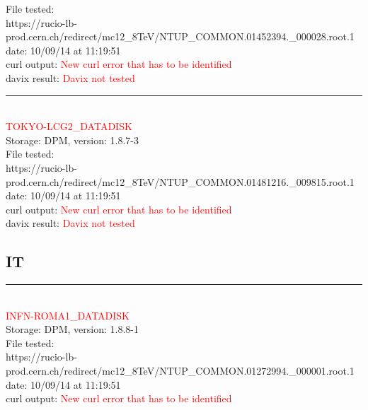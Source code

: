 File tested:\\
\footnotesize{https://rucio-lb-prod.cern.ch/redirect/mc12\_8TeV/NTUP\_COMMON.01452394.\_000028.root.1}\\

date: 10/09/14 at 11:19:51\\

curl output:  \textcolor{red}{New curl error that has to be identified}\\

davix result:  \textcolor{red}{Davix not tested}\\

\rule{\textwidth}{1pt}\\

\textcolor{red}{\normalsize{TOKYO-LCG2\_DATADISK}}\\

Storage: DPM, version: 1.8.7-3\\

File tested:\\
\footnotesize{https://rucio-lb-prod.cern.ch/redirect/mc12\_8TeV/NTUP\_COMMON.01481216.\_009815.root.1}\\

date: 10/09/14 at 11:19:51\\

curl output:  \textcolor{red}{New curl error that has to be identified}\\

davix result:  \textcolor{red}{Davix not tested}\\

\subsection{IT}

\rule{\textwidth}{1pt}\\

\textcolor{red}{\normalsize{INFN-ROMA1\_DATADISK}}\\

Storage: DPM, version: 1.8.8-1\\

File tested:\\
\footnotesize{https://rucio-lb-prod.cern.ch/redirect/mc12\_8TeV/NTUP\_COMMON.01272994.\_000001.root.1}\\

date: 10/09/14 at 11:19:51\\

curl output:  \textcolor{red}{New curl error that has to be identified}\\

